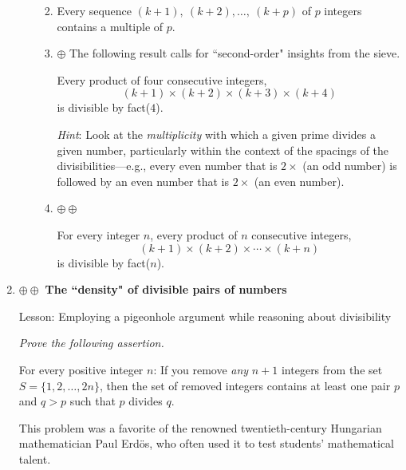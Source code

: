 \begin{enumerate}
\begin{enumerate}
\begin{enumerate}
     \medskip\item
\begin{prop}
Every sequence $(k+1), \ (k+2), \ldots, \ (k+p)$ of $p$ integers contains a multiple of $p$.
\end{prop}

      \medskip\item 
      $\oplus$ The following result calls for ``second-order" insights from the sieve.
\begin{prop}
Every product of four consecutive integers,
\[ (k+1) \times (k+2) \times (k+3) \times (k+4) \]
is divisible by {\sc fact}($4$).
\end{prop}

\smallskip

{\em Hint}:  Look at the {\em multiplicity} with which a given prime divides a given number, particularly within the context of the spacings of the divisibilities---e.g., every even number that is $2 \times$ (an odd number) is followed by an even number that is $2 \times$ (an even number).  

  \medskip\item
$\oplus \oplus$ 
\begin{prop}
For every integer $n$, every product of $n$ consecutive integers,
\[ (k+1) \times (k+2) \times \cdots \times (k+n) \]
is divisible by {\sc fact}($n$).
\end{prop}
     \end{enumerate}
  \end{enumerate}


  \medskip\item
$\oplus \oplus$
{\bf The ``density"  of divisible pairs of numbers}

{\sc Lesson:} Employing a pigeonhole argument while reasoning about divisibility

\smallskip

{\em Prove the following assertion.}

\begin{prop}
For every positive integer $n$:  If you remove {\em any} $n+1$ integers from the set $S = \{ 1, 2, \ldots, 2n\}$, then the set of removed integers contains at least one pair $p$ and $q > p$ such that $p$ divides $q$.
\end{prop}


This problem was a favorite of the renowned twentieth-century Hungarian mathematician Paul Erd\"{o}s, who often used it to test students' mathematical talent.


\end{enumerate}
